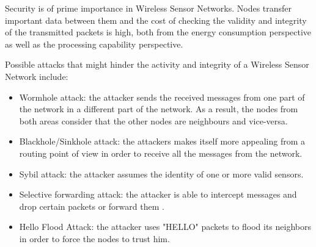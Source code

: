 Security is of prime importance in Wireless Sensor Networks. Nodes transfer important data between
them and the cost of checking the validity and integrity of the transmitted packets is high, both from 
the energy consumption perspective as well as the processing capability perspective.

Possible attacks that might hinder the activity and integrity of a Wireless Sensor Network include:
\begin{itemize}

\item Wormhole attack: the attacker sends the received messages from one part of the network in a different part of the network. As a result, the nodes from both areas consider that the other nodes are neighbours and vice-versa.
\item Blackhole/Sinkhole attack: the attackers makes itself more appealing from a routing point of view in order to receive all the messages from the network.
\item Sybil attack: the attacker assumes the identity of one or more valid sensors\cite{newsome2004sybil}.
\item Selective forwarding attack: the attacker is able to intercept messages and drop certain packets or forward them \cite{kaplantzis2007detecting}.
\item Hello Flood Attack: the attacker uses "HELLO" packets to flood its neighbors in order to force the nodes to trust him.

\end{itemize}

